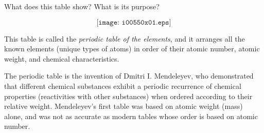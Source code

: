 

What does this table show?  What is its purpose?

$$\texttt{[image: i00550x01.eps]}$$







This table is called the {\it periodic table of the elements}, and it arranges all the known elements (unique types of atoms) in order of their atomic number, atomic weight, and chemical characteristics.







The periodic table is the invention of Dmitri I. Mendeleyev, who demonstrated that different chemical substances exhibit a periodic recurrence of chemical properties (reactivities with other substances) when ordered according to their relative weight.  Mendeleyev's first table was based on atomic weight (mass) alone, and was not as accurate as modern tables whose order is based on atomic number.




